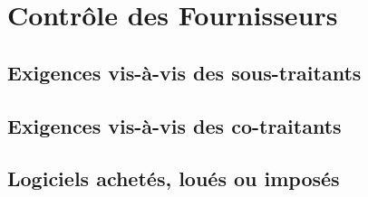 \section{Contrôle des Fournisseurs}

\subsection{Exigences vis-à-vis des sous-traitants}

\subsection{Exigences vis-à-vis des co-traitants}

\subsection{Logiciels achetés, loués ou imposés}
\pagebreak
